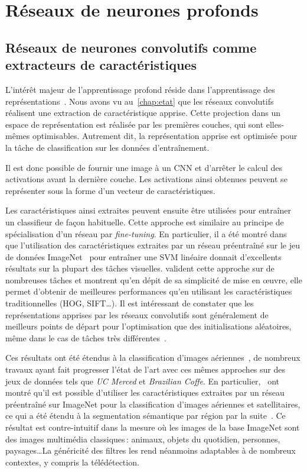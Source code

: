 \section{Réseaux de neurones profonds}

\subsection{Réseaux de neurones convolutifs comme extracteurs de caractéristiques}

L'intérêt majeur de l'apprentissage profond réside dans l'apprentissage des représentations~\cite{bengio_representation_2013,goodfellow_deep_2016}. Nous avons vu au~\cref{chap:etat} que les réseaux convolutifs réalisent une extraction de caractéristique apprise. Cette projection dans un espace de représentation est réalisée par les premières couches, qui sont elles-mêmes optimisables. Autrement dit, la représentation apprise est optimisée pour la tâche de classification sur les données d'entraînement.

Il est donc possible de fournir une image à un \gls{CNN} et d'arrêter le calcul des activations avant la dernière couche. Les activations ainsi obtenues peuvent se représenter sous la forme d'un vecteur de caractéristiques.

Les caractéristiques ainsi extraites peuvent ensuite être utilisées pour entraîner un classifieur de façon habituelle. Cette approche est similaire au principe de spécialisation d'un réseau par \emph{fine-tuning}. En particulier, il a été montré dans~\cite{razavian_cnn_2014} que l'utilisation des caractéristiques extraites par un réseau préentraîné sur le jeu de données ImageNet~\cite{deng_imagenet_2009} pour entraîner une \gls{SVM} linéaire donnait d'excellents résultats sur la plupart des tâches visuelles. \citet{razavian_cnn_2014} valident cette approche sur de nombreuses tâches et montrent qu'en dépit de sa simplicité de mise en \oe{}uvre, elle permet d'obtenir de meilleures performances qu'en utilisant les caractéristiques traditionnelles (\gls{HOG}, \gls{SIFT}\dots). Il est intéressant de constater que les représentations apprises par les réseaux convolutifs sont généralement de meilleurs points de départ pour l'optimisation que des initialisations aléatoires, même dans le cas de tâches très différentes~\cite{yosinski_how_2014}.

Ces résultats ont été étendus à la classification d'images aériennes~\cite{penatti_deep_2015,marmanis_deep_2016,lagrange_benchmarking_2015}, de nombreux travaux ayant fait progresser l'état de l'art avec ces mêmes approches sur des jeux de données tels que \emph{UC Merced} et \emph{Brazilian Coffe}. En particulier,~\citet{marmanis_deep_2016,penatti_deep_2015} ont montré  qu'il est possible d'utiliser les caractéristiques extraites par un réseau préentraîné sur ImageNet pour la classification d'images aériennes et satellitaires, ce qui a été étendu à la segmentation sémantique par région par la suite~\cite{lagrange_benchmarking_2015}. Ce résultat est contre-intuitif dans la mesure où les images de la base ImageNet sont des images multimédia classiques\,: animaux, objets du quotidien, personnes, paysages\dots La généricité des filtres les rend néanmoins adaptables à de nombreux contextes, y compris la télédétection.

